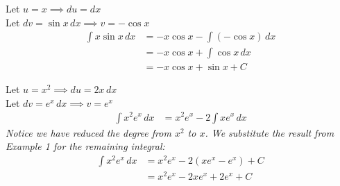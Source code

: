 \begin{example}
Let $u = x \implies du = dx$ \\
Let $dv = \sin x \, dx \implies v = -\cos x$
\begin{align*}
  \int x \sin x \, dx &= -x \cos x - \int (-\cos x) \, dx \\
  &= -x \cos x + \int \cos x \, dx \\
  &= -x \cos x + \sin x + C
\end{align*}
\end{example}

\begin{example}
Let $u = x^2 \implies du = 2x \, dx$ \\
Let $dv = e^x \, dx \implies v = e^x$
\begin{align*}
  \int x^2 e^x \, dx &= x^2 e^x - 2\int x e^x \, dx
\end{align*}
\textit{Notice we have reduced the degree from $x^2$ to $x$. We substitute the result from Example 1 for the remaining integral:}
\begin{align*}
  \int x^2 e^x \, dx &= x^2 e^x - 2(x e^x - e^x) + C \\
  &= x^2 e^x - 2x e^x + 2e^x + C
\end{align*}
\end{example}

